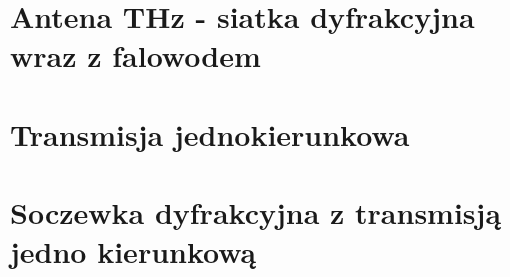 

\section{Antena THz - siatka dyfrakcyjna wraz z falowodem}


\section{Transmisja jednokierunkowa}

\section{Soczewka dyfrakcyjna z transmisją jedno kierunkową}

